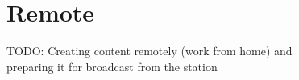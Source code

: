 \documentclass[../StudioOperationGuide.tex]{subfiles}
\begin{document}
\chapter{Remote}
TODO: Creating content remotely (work from home) and \\ preparing it for broadcast from the station
\end{document}
